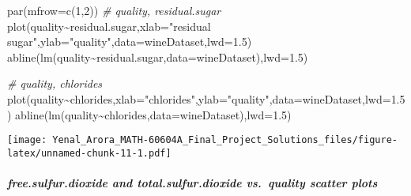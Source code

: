 \documentclass[
]{article}
\newenvironment{Shaded}{\begin{snugshade}}{\end{snugshade}}
\newcommand{\AttributeTok}[1]{\textcolor[rgb]{0.77,0.63,0.00}{#1}}
\newcommand{\CommentTok}[1]{\textcolor[rgb]{0.56,0.35,0.01}{\textit{#1}}}
\newcommand{\DecValTok}[1]{\textcolor[rgb]{0.00,0.00,0.81}{#1}}
\newcommand{\FloatTok}[1]{\textcolor[rgb]{0.00,0.00,0.81}{#1}}
\newcommand{\FunctionTok}[1]{\textcolor[rgb]{0.00,0.00,0.00}{#1}}
\newcommand{\NormalTok}[1]{#1}
\newcommand{\SpecialCharTok}[1]{\textcolor[rgb]{0.00,0.00,0.00}{#1}}
\newcommand{\StringTok}[1]{\textcolor[rgb]{0.31,0.60,0.02}{#1}}
\begin{document}
\begin{Shaded}
\begin{Highlighting}[]
\FunctionTok{par}\NormalTok{(}\AttributeTok{mfrow=}\FunctionTok{c}\NormalTok{(}\DecValTok{1}\NormalTok{,}\DecValTok{2}\NormalTok{))}
\CommentTok{\# quality, residual.sugar}
\FunctionTok{plot}\NormalTok{(quality}\SpecialCharTok{\textasciitilde{}}\NormalTok{residual.sugar,}\AttributeTok{xlab=}\StringTok{"residual sugar"}\NormalTok{,}\AttributeTok{ylab=}\StringTok{"quality"}\NormalTok{,}\AttributeTok{data=}\NormalTok{wineDataset,}\AttributeTok{lwd=}\FloatTok{1.5}\NormalTok{)}
\FunctionTok{abline}\NormalTok{(}\FunctionTok{lm}\NormalTok{(quality}\SpecialCharTok{\textasciitilde{}}\NormalTok{residual.sugar,}\AttributeTok{data=}\NormalTok{wineDataset),}\AttributeTok{lwd=}\FloatTok{1.5}\NormalTok{)}

\CommentTok{\# quality, chlorides}
\FunctionTok{plot}\NormalTok{(quality}\SpecialCharTok{\textasciitilde{}}\NormalTok{chlorides,}\AttributeTok{xlab=}\StringTok{"chlorides"}\NormalTok{,}\AttributeTok{ylab=}\StringTok{"quality"}\NormalTok{,}\AttributeTok{data=}\NormalTok{wineDataset,}\AttributeTok{lwd=}\FloatTok{1.5}\NormalTok{)}
\FunctionTok{abline}\NormalTok{(}\FunctionTok{lm}\NormalTok{(quality}\SpecialCharTok{\textasciitilde{}}\NormalTok{chlorides,}\AttributeTok{data=}\NormalTok{wineDataset),}\AttributeTok{lwd=}\FloatTok{1.5}\NormalTok{)}
\end{Highlighting}
\end{Shaded}

\texttt{[image: Yenal\_Arora\_MATH-60604A\_Final\_Project\_Solutions\_files/figure-latex/unnamed-chunk-11-1.pdf]}

\hypertarget{free.sulfur.dioxide-and-total.sulfur.dioxide-vs.-quality-scatter-plots}{%
\subparagraph{free.sulfur.dioxide and total.sulfur.dioxide vs.~quality
scatter
plots}\label{free.sulfur.dioxide-and-total.sulfur.dioxide-vs.-quality-scatter-plots}}
\end{document}
